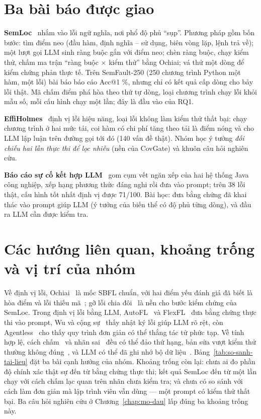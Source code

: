 \section{Ba bài báo được giao}
\label{sec:ba-bai-bao}

\textbf{SemLoc}~\cite{yang2026semloc} nhắm vào lỗi ngữ nghĩa, nơi phổ độ phủ ``sụp''. Phương pháp gồm bốn bước: tìm điểm
neo (đầu hàm, định nghĩa -- sử dụng, biên vòng lặp, lệnh trả về); một lượt gọi LLM sinh ràng buộc gắn với điểm neo; chèn
ràng buộc, chạy kiểm thử, chấm ma trận ``ràng buộc $\times$ kiểm thử'' bằng Ochiai; vá thử một dòng để kiểm chứng phản
thực tế. Trên SemFault-250 (250 chương trình Python một hàm, một lỗi) bài báo báo cáo Acc@1
\RqOneSemlocClaudeTZeroEightAuthorAllAccOne\%, nhưng chỉ có kết quả cấp dòng cho bảy lỗi thật. Mã chấm điểm phá hòa theo
thứ tự dòng, loại chương trình chạy lỗi khỏi mẫu số, mỗi cấu hình chạy một lần; đây là đầu vào của RQ1.

\textbf{EffiHolmes}~\cite{yang2026effiholmes} định vị lỗi hiệu năng, loại lỗi không làm kiểm thử thất bại: chạy chương
trình ở hai mức tải, coi hàm có chi phí tăng theo tải là điểm nóng và cho LLM lập luận trên đường gọi tới đó (140 vấn
đề thật). Nhóm học ý tưởng \emph{đối chiếu hai lần thực thi để lọc nhiễu} (nền của CovGate) và khuôn câu hỏi nghiên cứu.

\textbf{Báo cáo sự cố kết hợp LLM}~\cite{medeiros2026crash} gom cụm vết ngăn xếp của hai hệ thống Java công nghiệp, xếp
hạng phương thức đáng nghi rồi đưa vào prompt; trên 38 lỗi thật, cấu hình tốt nhất định vị được 71/100. Bài học: đưa
bằng chứng đã khai thác vào prompt giúp LLM (ý tưởng của biến thể có độ phủ từng dòng), và đầu ra LLM cần được kiểm tra.

\section{Các hướng liên quan, khoảng trống và vị trí của nhóm}
\label{sec:khoang-trong}

Về định vị lỗi, Ochiai~\cite{abreu2009} là mốc SBFL chuẩn, với hai điểm yếu đánh giá đã biết là hòa điểm và lỗi thiếu
mã~\cite{wong2016survey}; gỡ lỗi chia đôi~\cite{zeller2002tse} là nền cho bước kiểm chứng của SemLoc. Trong định vị lỗi
bằng LLM, AutoFL~\cite{kang2024autofl} và FlexFL~\cite{xu2025flexfl} đưa bằng chứng thực thi vào prompt, Wu và cộng
sự~\cite{wu2023llmfl} thấy nhật ký lỗi giúp LLM rõ rệt, còn Agentless~\cite{xia2024agentless} cho thấy quy trình đơn
giản có thể thắng tác tử phức tạp. Về tính hợp lệ, cách chấm~\cite{pearson2017} và nhãn sai~\cite{northcutt2021labels}
đều có thể đảo thứ hạng, bản sửa vượt kiểm thử thường không đúng~\cite{qi2015kali}, và LLM có thể đã ghi nhớ bộ dữ
liệu~\cite{ramos2024memorize}. Bảng~\ref{tab:so-sanh-tai-lieu} đặt ba bài cạnh hướng của nhóm. Khoảng trống còn lại: chưa ai đo phần độ chính xác thật
sự đến từ bằng chứng thực thi; kết quả SemLoc đến từ một lần chạy với cách chấm lạc quan trên nhãn chưa kiểm tra; và
chưa có so sánh với cách làm đơn giản mà lập trình viên vẫn dùng --- một prompt có kiểm thử thất bại. Ba câu hỏi nghiên
cứu ở Chương~\ref{chap:mo-dau} lấp đúng ba khoảng trống này.

